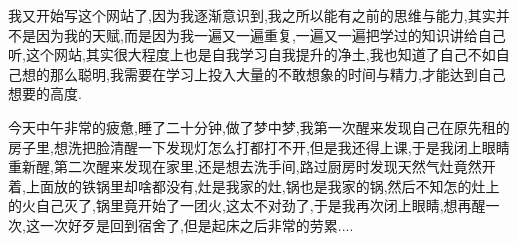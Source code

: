 我又开始写这个网站了,因为我逐渐意识到,我之所以能有之前的思维与能力,其实并不是因为我的天赋,而是因为我一遍又一遍重复,一遍又一遍把学过的知识讲给自己听,这个网站,其实很大程度上也是自我学习自我提升的净土,我也知道了自己不如自己想的那么聪明,我需要在学习上投入大量的不敢想象的时间与精力,才能达到自己想要的高度.

今天中午非常的疲惫,睡了二十分钟,做了梦中梦,我第一次醒来发现自己在原先租的房子里,想洗把脸清醒一下发现灯怎么打都打不开,但是我还得上课,于是我闭上眼睛重新醒,第二次醒来发现在家里,还是想去洗手间,路过厨房时发现天然气灶竟然开着,上面放的铁锅里却啥都没有,灶是我家的灶,锅也是我家的锅,然后不知怎的灶上的火自己灭了,锅里竟开始了一团火,这太不对劲了,于是我再次闭上眼睛,想再醒一次,这一次好歹是回到宿舍了,但是起床之后非常的劳累....





